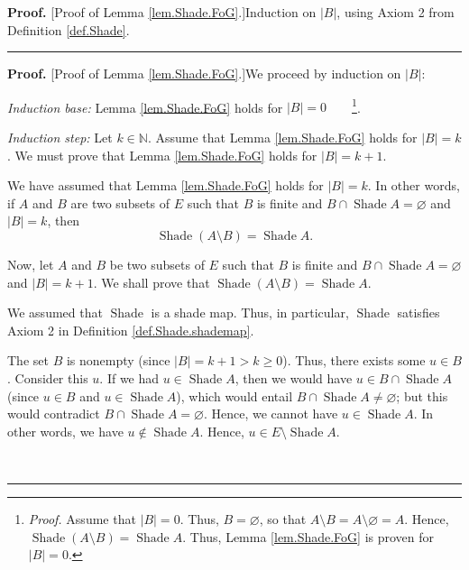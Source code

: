 \documentclass[numbers=enddot,12pt,final,onecolumn]{scrartcl}%
\theoremstyle{definition}
\newenvironment{proof}[1][Proof]{\noindent\textbf{#1.} }{\ \rule{0.5em}{0.5em}}
\newenvironment{verlong}{}{}
\newenvironment{vershort}{}{}
\renewcommand{\geq}{\geqslant}
\begin{document}
\begin{vershort}
\begin{proof}
[Proof of Lemma \ref{lem.Shade.FoG}.]Induction on $\left\vert B\right\vert $,
using Axiom 2 from Definition \ref{def.Shade}.
\end{proof}
\end{vershort}

\begin{verlong}
\begin{proof}
[Proof of Lemma \ref{lem.Shade.FoG}.]We proceed by induction on $\left\vert
B\right\vert $:

\textit{Induction base:} Lemma \ref{lem.Shade.FoG} holds for $\left\vert
B\right\vert =0$\ \ \ \ \footnote{\textit{Proof.} Assume that $\left\vert
B\right\vert =0$. Thus, $B=\varnothing$, so that $A\setminus B=A\setminus
\varnothing=A$. Hence, $\operatorname*{Shade}\left(  A\setminus B\right)
=\operatorname*{Shade}A$. Thus, Lemma \ref{lem.Shade.FoG} is proven for
$\left\vert B\right\vert =0$.}.

\textit{Induction step:} Let $k\in\mathbb{N}$. Assume that Lemma
\ref{lem.Shade.FoG} holds for $\left\vert B\right\vert =k$. We must prove that
Lemma \ref{lem.Shade.FoG} holds for $\left\vert B\right\vert =k+1$.

We have assumed that Lemma \ref{lem.Shade.FoG} holds for $\left\vert
B\right\vert =k$. In other words, if $A$ and $B$ are two subsets of $E$ such
that $B$ is finite and $B\cap\operatorname*{Shade}A=\varnothing$ and
$\left\vert B\right\vert =k$, then%
\begin{equation}
\operatorname*{Shade}\left(  A\setminus B\right)  =\operatorname*{Shade}A.
\label{pf.lem.Shade.FoG.IH}%
\end{equation}


Now, let $A$ and $B$ be two subsets of $E$ such that $B$ is finite and
$B\cap\operatorname*{Shade}A=\varnothing$ and $\left\vert B\right\vert =k+1$.
We shall prove that $\operatorname*{Shade}\left(  A\setminus B\right)
=\operatorname*{Shade}A$.

We assumed that $\operatorname*{Shade}$ is a shade map. Thus, in particular,
$\operatorname*{Shade}$ satisfies Axiom 2 in Definition
\ref{def.Shade.shademap}.

The set $B$ is nonempty (since $\left\vert B\right\vert =k+1>k\geq0$). Thus,
there exists some $u\in B$. Consider this $u$. If we had $u\in
\operatorname*{Shade}A$, then we would have $u\in B\cap\operatorname*{Shade}A$
(since $u\in B$ and $u\in\operatorname*{Shade}A$), which would entail
$B\cap\operatorname*{Shade}A\neq\varnothing$; but this would contradict
$B\cap\operatorname*{Shade}A=\varnothing$. Hence, we cannot have
$u\in\operatorname*{Shade}A$. In other words, we have $u\notin%
\operatorname*{Shade}A$. Hence, $u\in E\setminus\operatorname*{Shade}A$.


\end{proof}
\end{verlong}
\end{document}

